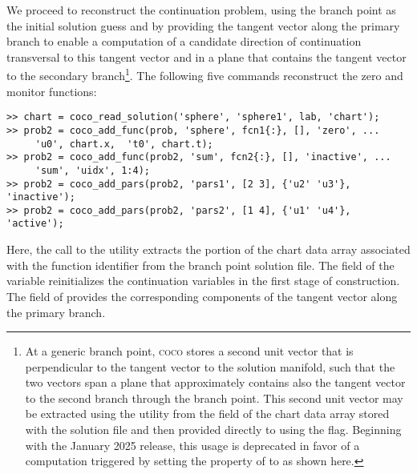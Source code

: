 We proceed to reconstruct the continuation problem, using the branch point as the initial solution guess and by providing the tangent vector along the primary branch to enable a computation of a candidate direction of continuation transversal to this tangent vector and in a plane that contains the tangent vector to the secondary branch\footnote{At a generic branch point, \textsc{coco} stores a second unit vector that is perpendicular to the tangent vector to the solution manifold, such that the two vectors span a plane that  approximately contains also the tangent vector to the second branch through the branch point. This second unit vector may be extracted using the  utility from the  field of the chart data array stored with the solution file and then provided directly to  using the  flag. Beginning with the January 2025 release, this usage is deprecated in favor of a computation triggered by setting the  property of  to  as shown here.}. The following five commands reconstruct the zero and monitor functions:
\begin{lstlisting}[language=coco-highlight]
>> chart = coco_read_solution('sphere', 'sphere1', lab, 'chart');
>> prob2 = coco_add_func(prob, 'sphere', fcn1{:}, [], 'zero', ...
     'u0', chart.x,  't0', chart.t);
>> prob2 = coco_add_func(prob2, 'sum', fcn2{:}, [], 'inactive', ...
     'sum', 'uidx', 1:4);
>> prob2 = coco_add_pars(prob2, 'pars1', [2 3], {'u2' 'u3'}, 'inactive');
>> prob2 = coco_add_pars(prob2, 'pars2', [1 4], {'u1' 'u4'}, 'active');
\end{lstlisting}
Here, the call to the  utility extracts the portion of the chart data array associated with the function identifier  from the branch point solution file. The  field of the  variable reinitializes the continuation variables in the first stage of construction. The  field of  provides the corresponding components of the tangent vector along the primary branch.

